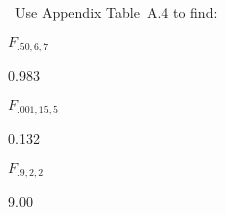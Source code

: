 \begin{problem}
  ~Use Appendix Table~A.4 to find:
\end{problem}

\begin{subproblem}
  $F_{.50,6,7}$
\end{subproblem}

0.983

\begin{subproblem}
  $F_{.001,15,5}$
\end{subproblem}

0.132

\begin{subproblem}
  $F_{.9,2,2}$
\end{subproblem}

9.00
